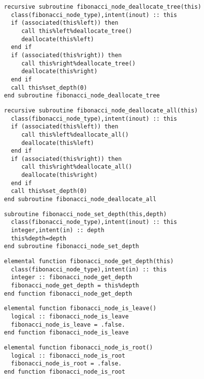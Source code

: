 \begin{Verbatim}
  recursive subroutine fibonacci_node_deallocate_tree(this)
    class(fibonacci_node_type),intent(inout) :: this
    if (associated(this%left)) then
       call this%left%deallocate_tree()
       deallocate(this%left)
    end if
    if (associated(this%right)) then
       call this%right%deallocate_tree()
       deallocate(this%right)
    end if
    call this%set_depth(0)
  end subroutine fibonacci_node_deallocate_tree
\end{Verbatim}

\begin{Verbatim}
  recursive subroutine fibonacci_node_deallocate_all(this)
    class(fibonacci_node_type),intent(inout) :: this
    if (associated(this%left)) then
       call this%left%deallocate_all()
       deallocate(this%left)
    end if
    if (associated(this%right)) then
       call this%right%deallocate_all()
       deallocate(this%right)
    end if
    call this%set_depth(0)
  end subroutine fibonacci_node_deallocate_all
\end{Verbatim}

\begin{Verbatim}
  subroutine fibonacci_node_set_depth(this,depth)
    class(fibonacci_node_type),intent(inout) :: this
    integer,intent(in) :: depth
    this%depth=depth
  end subroutine fibonacci_node_set_depth
\end{Verbatim}

\begin{Verbatim}
  elemental function fibonacci_node_get_depth(this)
    class(fibonacci_node_type),intent(in) :: this
    integer :: fibonacci_node_get_depth
    fibonacci_node_get_depth = this%depth
  end function fibonacci_node_get_depth
\end{Verbatim}

\begin{Verbatim}
  elemental function fibonacci_node_is_leave()
    logical :: fibonacci_node_is_leave
    fibonacci_node_is_leave = .false.
  end function fibonacci_node_is_leave
\end{Verbatim}

\begin{Verbatim}
  elemental function fibonacci_node_is_root()
    logical :: fibonacci_node_is_root
    fibonacci_node_is_root = .false.
  end function fibonacci_node_is_root
\end{Verbatim}

